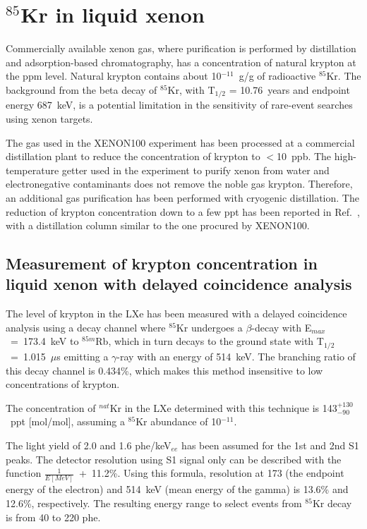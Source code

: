 \section{$^{85}$Kr in liquid xenon}
\label{secKr85}

Commercially available xenon gas, where purification is performed by distillation and adsorption-based chromatography, has a concentration of natural krypton at the ppm level.
Natural krypton contains about 10$^{-11}$~g/g of radioactive $^{85}$Kr. 
The background from the beta decay of $^{85}$Kr, with T$_{1/2}$ = 10.76~years and endpoint energy 687~keV, is a potential limitation in the sensitivity of rare-event searches using xenon targets.

The gas used in the XENON100 experiment has been processed at a commercial distillation plant to reduce the concentration of krypton to $<$10~ppb.
The high-temperature getter used in the experiment to purify xenon from water and electronegative contaminants does not remove the noble gas krypton. Therefore, an additional gas purification has been performed with cryogenic distillation. The reduction of krypton concentration down to a few ppt has been reported in Ref.~\cite{distillation}, with a distillation column similar to the one procured by XENON100.



\subsection{Measurement of krypton concentration in liquid xenon with delayed coincidence analysis}

The level of krypton in the LXe has been measured with a delayed coincidence analysis using a decay channel where $^{85}$Kr undergoes a $\beta$-decay with E$_{max}$~=~173.4~keV to $^{85m}$Rb, which in turn decays to the ground state with T$_{1/2}$~=~1.015~$\mu$s emitting a $\gamma$-ray with an energy of 514~keV. The branching ratio of this decay channel is 0.434\%, which makes this method insensitive to low concentrations of krypton.

The concentration of $^{nat}$Kr in the LXe determined with this technique is 143$_{-90}^{+130}$~ppt [mol/mol], assuming a $^{85}$Kr abundance of 10$^{-11}$.

The light yield of 2.0 and 1.6 phe/keV$_{ee}$ has been assumed for the 1st and 2nd S1 peaks.
The detector resolution using S1 signal only can be described with the function $\frac{1}{E [MeV]}$~+~11.2\%. Using this formula, resolution at 173 (the endpoint energy of the electron) and 514~keV (mean energy of the gamma) is 13.6\% and 12.6\%, respectively. The resulting energy range to select events from $^{85}$Kr decay is from 40 to 220 phe.


